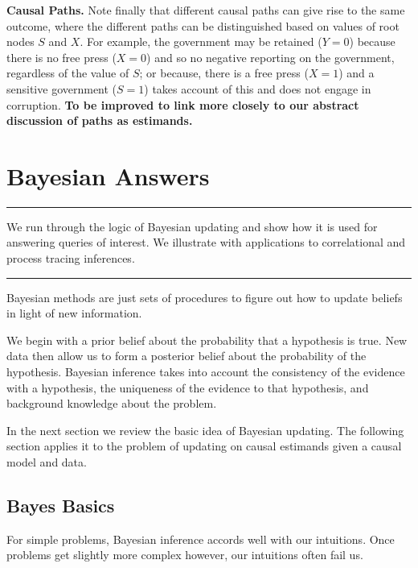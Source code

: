 \documentclass[12pt,]{book}
\begin{document}
\textbf{Causal Paths.} Note finally that different causal paths can give rise to the same outcome, where the different paths can be distinguished based on values of root nodes \(S\) and \(X\). For example, the government may be retained (\(Y=0\)) because there is no free press (\(X=0\)) and so no negative reporting on the government, regardless of the value of \(S\); or because, there is a free press (\(X=1\)) and a sensitive government (\(S=1\)) takes account of this and does not engage in corruption. \textbf{\color{red} To be improved to link more closely to our abstract discussion of paths as estimands.}

\hypertarget{bayeschapter}{%
\chapter{Bayesian Answers}\label{bayeschapter}}

\begin{center}\rule{0.5\linewidth}{\linethickness}\end{center}

We run through the logic of Bayesian updating and show how it is used for answering queries of interest. We illustrate with applications to correlational and process tracing inferences.

\begin{center}\rule{0.5\linewidth}{\linethickness}\end{center}

Bayesian methods are just sets of procedures to figure out how to update beliefs in light of new information.

We begin with a prior belief about the probability that a hypothesis is true. New data then allow us to form a posterior belief about the probability of the hypothesis. Bayesian inference takes into account the consistency of the evidence with a hypothesis, the uniqueness of the evidence to that hypothesis, and background knowledge about the problem.

In the next section we review the basic idea of Bayesian updating. The following section applies it to the problem of updating on causal estimands given a causal model and data.

\hypertarget{bayes-basics}{%
\section{Bayes Basics}\label{bayes-basics}}

For simple problems, Bayesian inference accords well with our intuitions. Once problems get slightly more complex however, our intuitions often fail us.
\end{document}
